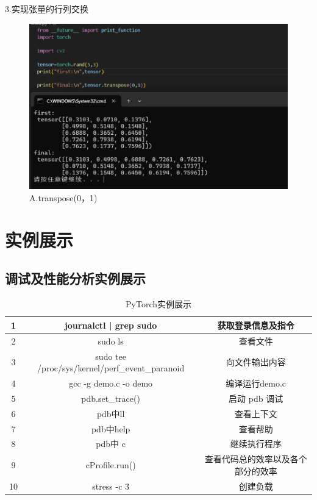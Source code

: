 \documentclass[a4paper, 12pt]{article}
\begin{document}
3.实现张量的行列交换
\begin{figure}[H]
  \centering
  \includegraphics[width=\textwidth]{屏幕截图 2024-09-15 110337.png}
  \caption{A.transpose(0，1)}
\end{figure}

\section{实例展示}
 \subsection{调试及性能分析实例展示}
\begin{table}[H]
\centering
\caption{ {\color{red}PyTorch实例展示}}
\begin{tabular}{ccc}
\toprule
1& journalctl | grep sudo &获取登录信息及指令  \\
\hline
2&sudo ls & 查看文件   \\ \hline
3&sudo tee /proc/sys/kernel/perf\_event\_paranoid &  向文件输出内容   \\ \hline
4&gcc -g demo.c -o demo& 编译运行demo.c    \\ \hline
 5 & pdb.set\_trace() &   启动 pdb 调试 \\ \hline
6& pdb中ll  &   查看上下文  \\ \hline
7& pdb中help & 查看帮助   \\  \hline
8& pdb中 c  & 继续执行程序  \\  \hline
9&cProfile.run()  &  查看代码总的效率以及各个部分的效率  \\ \hline
10&stress -c 3 &   创建负载
  \\
\bottomrule
\end{tabular}
\end{table}
\end{document}
